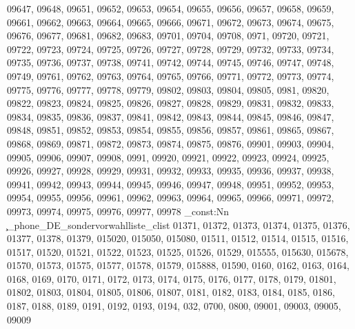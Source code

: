 {09647,
09648,
09651,
09652,
09653,
09654,
09655,
09656,
09657,
09658,
09659,
09661,
09662,
09663,
09664,
09665,
09666,
09671,
09672,
09673,
09674,
09675,
09676,
09677,
09681,
09682,
09683,
09701,
09704,
09708,
0971,
09720,
09721,
09722,
09723,
09724,
09725,
09726,
09727,
09728,
09729,
09732,
09733,
09734,
09735,
09736,
09737,
09738,
09741,
09742,
09744,
09745,
09746,
09747,
09748,
09749,
09761,
09762,
09763,
09764,
09765,
09766,
09771,
09772,
09773,
09774,
09775,
09776,
09777,
09778,
09779,
09802,
09803,
09804,
09805,
0981,
09820,
09822,
09823,
09824,
09825,
09826,
09827,
09828,
09829,
09831,
09832,
09833,
09834,
09835,
09836,
09837,
09841,
09842,
09843,
09844,
09845,
09846,
09847,
09848,
09851,
09852,
09853,
09854,
09855,
09856,
09857,
09861,
09865,
09867,
09868,
09869,
09871,
09872,
09873,
09874,
09875,
09876,
09901,
09903,
09904,
09905,
09906,
09907,
09908,
0991,
09920,
09921,
09922,
09923,
09924,
09925,
09926,
09927,
09928,
09929,
09931,
09932,
09933,
09935,
09936,
09937,
09938,
09941,
09942,
09943,
09944,
09945,
09946,
09947,
09948,
09951,
09952,
09953,
09954,
09955,
09956,
09961,
09962,
09963,
09964,
09965,
09966,
09971,
09972,
09973,
09974,
09975,
09976,
09977,
09978}
\clist_const:Nn \c_phone_DE_sondervorwahlliste_clist {01371,
01372,
01373,
01374,
01375,
01376,
01377,
01378,
01379,
015020,
015050,
015080,
01511,
01512,
01514,
01515,
01516,
01517,
01520,
01521,
01522,
01523,
01525,
01526,
01529,
015555,
015630,
015678,
01570,
01573,
01575,
01577,
01578,
01579,
015888,
01590,
0160,
0162,
0163,
0164,
0168,
0169,
0170,
0171,
0172,
0173,
0174,
0175,
0176,
0177,
0178,
0179,
01801,
01802,
01803,
01804,
01805,
01806,
01807,
0181,
0182,
0183,
0184,
0185,
0186,
0187,
0188,
0189,
0191,
0192,
0193,
0194,
032,
0700,
0800,
09001,
09003,
09005,
09009}
